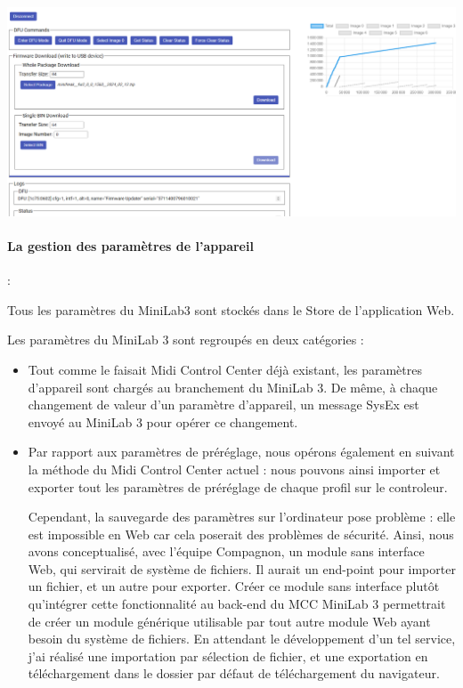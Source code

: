 \documentclass[francais]{rapportPFE}  %
\begin{document}
\begin{center}
	\centering
	\includegraphics[width=15cm]{graphics/dfu.png}
	\begin{tiny}
	\end{tiny}
	\label{fig}
\end{center}


\paragraph{La gestion des paramètres de l'appareil}:

Tous les paramètres du MiniLab3 sont stockés dans le Store de l'application Web.

Les paramètres du MiniLab 3 sont regroupés en deux catégories :
\begin{itemize}
    \item Tout comme le faisait Midi Control Center déjà existant, les paramètres d'appareil sont chargés au branchement du MiniLab 3. De même, à chaque changement de valeur d'un paramètre d'appareil, un message SysEx est envoyé au MiniLab 3 pour opérer ce changement.
    \item Par rapport aux paramètres de préréglage, nous opérons également en suivant la méthode du Midi Control Center actuel : nous pouvons ainsi importer et exporter tout les paramètres de préréglage de chaque profil sur le controleur. 
    
    Cependant, la sauvegarde des paramètres sur l'ordinateur pose problème : elle est impossible en Web car cela poserait des problèmes de sécurité. Ainsi, nous avons conceptualisé, avec l'équipe Compagnon, un module sans interface Web, qui servirait de système de fichiers. Il aurait un end-point pour importer un fichier, et un autre pour exporter. Créer ce module sans interface plutôt qu'intégrer cette fonctionnalité au back-end du MCC MiniLab 3 permettrait de créer un module générique utilisable par tout autre module Web ayant besoin du système de fichiers. En attendant le développement d'un tel service, j'ai réalisé une importation par sélection de fichier, et une exportation en téléchargement dans le dossier par défaut de téléchargement du navigateur.
\end{itemize}
\end{document}
